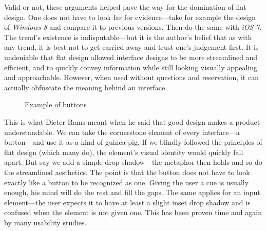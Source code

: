 \documentclass[thesis=M,english,hidelinks]{FITthesis}[2012/10/20]
\begin{document}
Valid or not, these arguments helped pave the way for the domination of flat design. One does not have to look far for evidence---take for example the design of \textit{Windows 8} and compare it to previous versions. Then do the same with \textit{iOS 7}. The trend's existence is indisputable---but it is the author's belief that as with any trend, it is best not to get carried away and trust one's judgement first. It is undeniable that flat design allowed interface designs to be more streamlined and efficient, and to quickly convey information while still looking visually appealing and approachable. However, when used without questions and reservation, it can actually obfuscate the meaning behind an interface.

\begin{figure}
  \setlength\fboxsep{0pt}
  \setlength\fboxrule{0.2pt}
  \caption{Example of buttons}
  \label{fig:buttons_example}
\end{figure}

This is what Dieter Rams meant when he said that good design makes a product understandable. We can take the cornerstone element of every interface---a button---and use it as a kind of guinea pig. If we blindly followed the principles of flat design (which many do), the element's visual identity would quickly fall apart. But say we add a simple drop shadow---the metaphor then holds and so do the streamlined aesthetics. The point is that the button does not have to look exactly like a button to be recognized as one. Giving the user a cue is usually enough, his mind will do the rest and fill the gaps. The same applies for an input element---the user expects it to have at least a slight inset drop shadow and is confused when the element is not given one. This has been proven time and again by many usability studies.
\end{document}
